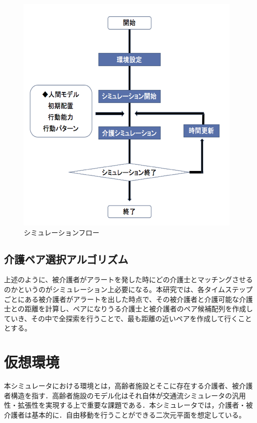 \begin{figure}[htb]
\begin{center}
 \includegraphics[scale=0.8]{figures/simulation_flow.png}
 \caption[シミュレーションフロー]{シミュレーションフロー \label{simulation_flow}}
\end{center}
\end{figure}

\subsection{介護ペア選択アルゴリズム}

上述のように、被介護者がアラートを発した時にどの介護士とマッチングさせるのかというのがシミュレーション上必要になる。本研究では、各タイムステップごとにある被介護者がアラートを出した時点で、その被介護者と介護可能な介護士との距離を計算し、ペアになりうる介護士と被介護者のペア候補配列を作成していき、その中で全探索を行うことで、最も距離の近いペアを作成して行くこととする。

\section{仮想環境}
本シミュレータにおける環境とは，高齢者施設とそこに存在する介護者、被介護者構造を指す．高齢者施設のモデル化はそれ自体が交通流シミュレータの汎用性・拡張性を実現する上で重要な課題である．本シミュレータでは，介護者・被介護者は基本的に．自由移動を行うことができる二次元平面を想定している。

